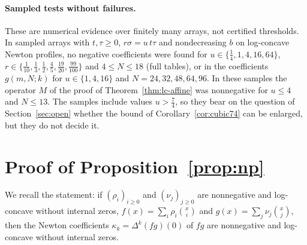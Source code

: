 \paragraph{Sampled tests without failures.} These are numerical evidence over finitely many arrays, not certified thresholds. In sampled arrays with $t,\tau\geq0$, $r\sigma=u\,t\tau$ and nondecreasing $b$ on log-concave Newton profiles, no negative coefficients were found for $u\in\{\frac14,1,4,16,64\}$, $r\in\{\frac1{10},\frac13,\frac12,\frac45,\frac{19}{20},\frac{99}{100}\}$ and $4\leq N\leq18$ (full tables), or in the coefficients $g(m,N;k)$ for $u\in\{1,4,16\}$ and $N=24,32,48,64,96$. In these samples the operator $M$ of the proof of Theorem~\ref{thm:lc-affine} was nonnegative for $u\leq4$ and $N\leq13$. The samples include values $u>\frac74$, so they bear on the question of Section~\ref{sec:open} whether the bound of Corollary~\ref{cor:cubic74} can be enlarged, but they do not decide it.


\section{Proof of Proposition~\ref{prop:np}}\label{app:np}

We recall the statement: if $(\rho_i)_{i\geq0}$ and $(\nu_j)_{j\geq0}$ are nonnegative and log-concave without internal zeros, $f(x)=\sum_i\rho_i\binom xi$ and $g(x)=\sum_j\nu_j\binom xj$, then the Newton coefficients $\kappa_k=\Delta^k(fg)(0)$ of $fg$ are nonnegative and log-concave without internal zeros.

